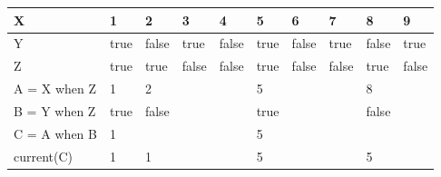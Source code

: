 \begin{tabular}{|l|l|l|l|l|l|l|l|l|l|}
  \hline
  X              &  1 & 2 & 3 & 4 & 5 & 6 & 7 & 8 & 9 \\\hline
  Y              & true & false & true & false & true & false & true & false &
                   true \\\hline
  Z              & true & true & false & false & true & false & false & true &
                   false \\\hline
  A = X when Z   & 1 & 2 & & & 5 & & & 8 &\\\hline
  B = Y when Z   & true & false & & & true & & & false &\\\hline
  C = A when B   & 1 & & & & 5  & & & &\\\hline
  current(C)   & 1 & 1 & & & 5 & & & 5 &\\\hline
\end{tabular}
